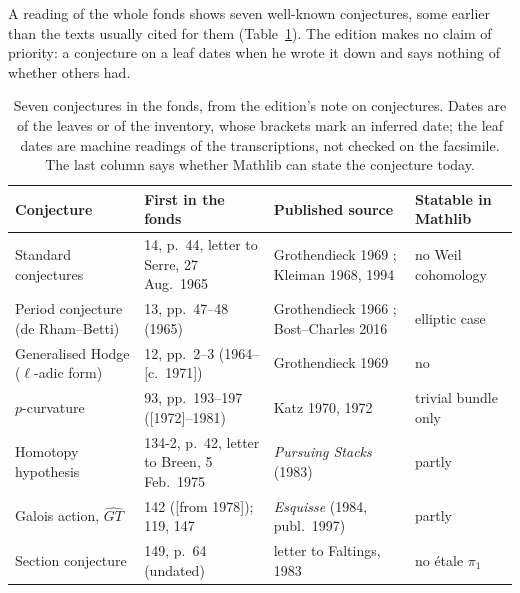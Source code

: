 \documentclass[runningheads,a4paper]{llncs}
\begin{document}
A reading of the whole fonds shows seven well-known conjectures, some earlier than the texts usually cited for them (Table~\ref{tab:conj}). The edition makes no claim of priority: a conjecture on a leaf dates when he wrote it down and says nothing of whether others had.

\begin{table}[t]\centering\scriptsize
\caption{Seven conjectures in the fonds, from the edition's note on conjectures. Dates are of the leaves or of the inventory, whose brackets mark an inferred date; the leaf dates are machine readings of the transcriptions, not checked on the facsimile. The last column says whether Mathlib can state the conjecture today.}\label{tab:conj}
\begin{tabularx}{\textwidth}{@{}>{\raggedright}p{2.5cm}>{\raggedright}p{3.1cm}>{\raggedright}X>{\raggedright\arraybackslash}p{2.2cm}@{}}\toprule
Conjecture & First in the fonds & Published source & Statable in Mathlib\\\midrule
Standard conjectures & 14, p.~44, letter to Serre, 27 Aug.\ 1965 & Grothendieck 1969 \cite{grothendieck1969standard}; Kleiman 1968, 1994 \cite{kleiman1968,kleiman1994} & no Weil cohomology\\
Period conjecture (de Rham--Betti) & 13, pp.~47--48 (1965) & Grothendieck 1966 \cite{grothendieck1966}; Bost--Charles 2016 \cite{bostcharles2016} & elliptic case\\
Generalised Hodge (\(\ell\)-adic form) & 12, pp.~2--3 (1964--[c.~1971]) & Grothendieck 1969 \cite{grothendieck1969hodge} & no\\
$p$-curvature & 93, pp.~193--197 ([1972]--1981) & Katz 1970, 1972 \cite{katz1970,katz1972} & trivial bundle only\\
Homotopy hypothesis & 134-2, p.~42, letter to Breen, 5 Feb.\ 1975 & \emph{Pursuing Stacks} (1983) \cite{maltsiniotis2022} & partly\\
Galois action, $\widehat{GT}$ & 142 ([from 1978]); 119, 147 & \emph{Esquisse} (1984, publ.\ 1997) \cite{esquisse} & partly\\
Section conjecture & 149, p.~64 (undated) & letter to Faltings, 1983 \cite{faltings1983} & no étale $\pi_1$\\\bottomrule
\end{tabularx}
\end{table}
\end{document}
